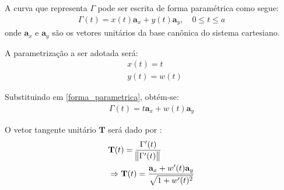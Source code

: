 A curva que representa $\Gamma$ pode ser escrita de forma paramétrica como segue:
\begin{align}
\Gamma(t) = x(t) \mathbf{a}_x + y(t) \mathbf{a}_y, \quad 0 \le t \le a \label{forma_parametrica}
\end{align}
onde $\mathbf{a}_x$ e $\mathbf{a}_y$ são os vetores unitários da base canônica do sistema cartesiano.

A parametrização a ser adotada será:
\begin{align}
& x(t) = t \label{parametrizacao_x}\\
& y(t) = w(t) \label{parametrizacao_y}
\end{align}

Substituindo em \eqref{forma_parametrica}, obtém-se:
\begin{align}
\Gamma(t) = t \mathbf{a}_x + w(t) \mathbf{a}_y \label{forma_parametrica_substituida}
\end{align}

O vetor tangente unitário $\mathbf{T}$ será dado por \citep{livro_stewart_2}:
\begin{align}
& \mathbf{T}(t) = \frac{\Gamma'(t)}{\norm{\Gamma'(t)}} \nonumber \\
& \Rightarrow \mathbf{T}(t) = \frac{\mathbf{a}_x + w'(t) \mathbf{a}_y}{\sqrt{1 + w'(t)^2}}
\end{align}

